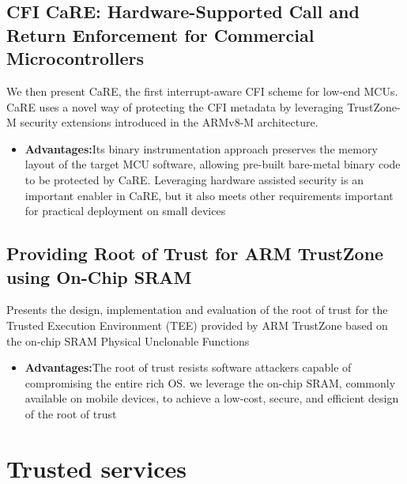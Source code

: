 \documentclass[conference]{IEEEtran}
\begin{document}
\subsection{CFI CaRE: Hardware-Supported Call and Return Enforcement for Commercial Microcontrollers}
We then present CaRE, the first interrupt-aware CFI scheme for low-end MCUs. CaRE uses a novel way of protecting the CFI metadata by leveraging TrustZone-M security extensions introduced in the ARMv8-M architecture.
\begin{itemize}
    \item \textbf{Advantages:}Its binary instrumentation approach preserves the memory layout of the target MCU software, allowing pre-built bare-metal binary code to be protected by CaRE. Leveraging hardware assisted security is an important enabler in CaRE, but it also meets other requirements important for practical deployment on small devices
\end{itemize}


\subsection{Providing Root of Trust for ARM TrustZone using On-Chip SRAM}
Presents the design, implementation and evaluation of the root of trust for the Trusted Execution Environment (TEE) provided by ARM TrustZone based on the on-chip SRAM Physical Unclonable Functions
\begin{itemize}
    \item \textbf{Advantages:}The root of trust resists software attackers capable of compromising the entire rich OS. we leverage the on-chip SRAM, commonly available on mobile devices, to achieve a low-cost, secure, and efficient design of the root of trust
\end{itemize}


\section{Trusted services}
\end{document}
